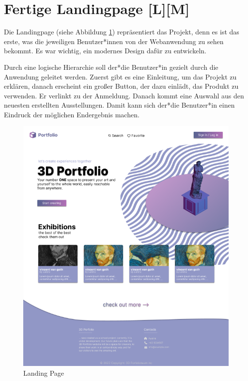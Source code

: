 \section{Fertige Landingpage [L][M]}
Die Landingpage (siehe Abbildung \ref{fig:impl:finishedLandingpage}) repräsentiert das Projekt, denn es ist das erste, was die jeweiligen Benutzer*innen von der Webanwendung zu sehen bekommt. Es war wichtig, ein modernes Design dafür zu entwickeln.

Durch eine logische Hierarchie soll der*die Benutzer*in gezielt durch die Anwendung geleitet werden. Zuerst gibt es eine Einleitung, um das Projekt zu erklären, danach erscheint ein großer Button, der dazu einlädt, das Produkt zu verwenden. Er verlinkt zu der Anmeldung. Danach kommt eine Auswahl aus den neuesten erstellten Ausstellungen. Damit kann sich der*die Benutzer*in einen Eindruck der möglichen Endergebnis machen.

\begin{figure}[h t]
    \centering
    \includegraphics[scale=.5]{pics/startingpage.png}
    \caption{Landing Page}
    \label{fig:impl:finishedLandingpage}
\end{figure}

